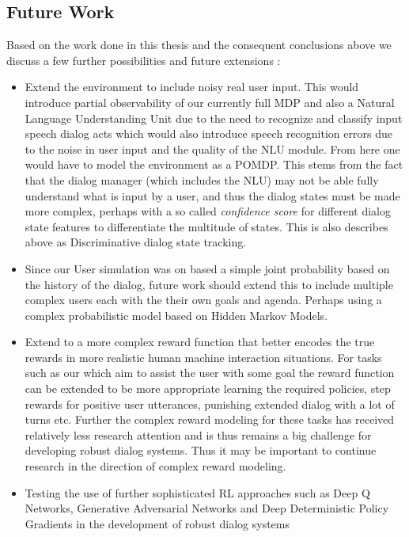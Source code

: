 \documentclass[12pt]{extarticle}
\numberwithin{equation}{section}
\begin{document}
	\subsection{Future Work}
	Based on the work done in this thesis and the consequent conclusions above we discuss a few further possibilities and future extensions :
	\begin{itemize}
		\item Extend the environment to include noisy real user input. This would introduce partial observability of our currently full MDP and also a Natural Language Understanding Unit due to the need to recognize and classify input speech dialog acts which would also introduce speech recognition errors due to the noise in user input and the quality of the NLU module. From here one would have to model the environment as a POMDP\cite{Sutton-introRL}. This stems from the fact that the dialog manager (which includes the NLU) may not be able fully understand what is input by a user, and thus the dialog states must be made more complex, perhaps with a so called \textit{confidence score} for different dialog state features to differentiate the multitude of states. This is also describes above as Discriminative dialog state tracking.
		\item Since our User simulation was on based a simple joint probability based on the history of the dialog, future work should extend this to include multiple complex users each with the their own goals and agenda. Perhaps using a complex probabilistic model based on Hidden Markov Models.
		\item Extend to a more complex reward function that better encodes the true rewards in more realistic human machine interaction situations. For tasks such as our which aim to assist the user with some goal the reward function can be extended to be more appropriate learning the required policies, step rewards for positive user utterances, punishing extended dialog with a lot of turns etc. Further the complex reward modeling for these tasks has received relatively less research attention and is thus remains a big challenge for developing robust dialog systems. Thus it may be important to continue research in the direction of complex reward modeling.
		\item Testing the use of further sophisticated RL approaches such as Deep Q Networks, Generative Adversarial Networks and Deep Deterministic Policy Gradients in the development of robust dialog systems
	\end{itemize}
	
\end{document}
